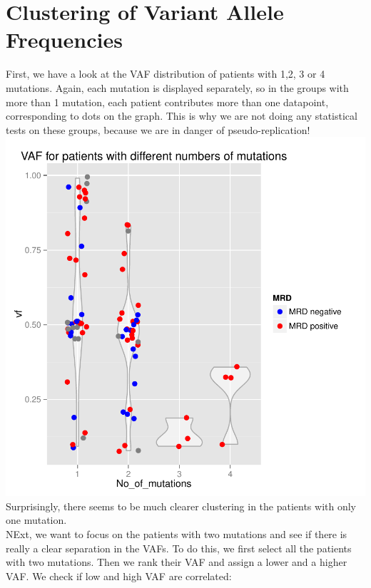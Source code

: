 \documentclass[a4paper,11pt]{article}
\begin{document}
\section*{Clustering of Variant Allele Frequencies}
First, we have a look at the VAF distribution of patients with 1,2, 3 or 4 mutations. Again, each mutation is displayed separately, so in the groups with more than 1 mutation, each patient contributes more than one datapoint, corresponding to dots on the graph. This is why we are not doing any statistical tests on these groups, because we are in danger of pseudo-replication!\\
\includegraphics{ATM_VAF-007}
\\Surprisingly, there seems to be much clearer clustering in the patients with only one mutation.\\
NExt, we want to focus on the patients with two mutations and see if there is really a clear separation in the VAFs. To do this, we first select all the patients with two mutations. Then we rank their VAF and assign a lower and a higher VAF. 
We check if low and high VAF are correlated:\\
\end{document}
